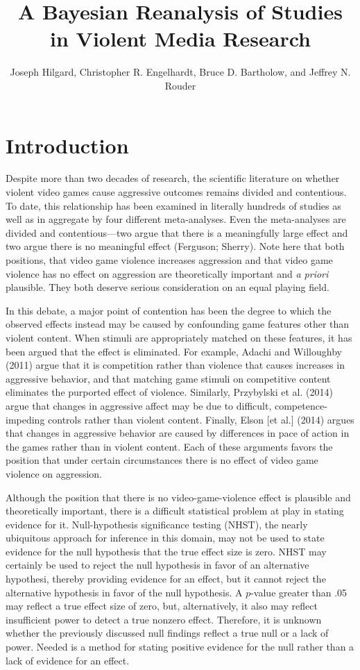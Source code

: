 \documentclass[fignum,nobf,man]{apa}
\author{Joseph Hilgard, Christopher R. Engelhardt, Bruce D. Bartholow, and Jeffrey N. Rouder}
\title{A Bayesian Reanalysis of Studies in Violent Media Research}
\affiliation{University of Missouri}
\begin{document}
\maketitle

\section*{Introduction}
Despite more than two decades of research, the scientific literature on whether violent video games cause aggressive outcomes remains divided and contentious. To date, this relationship has been examined in literally hundreds of studies as well as in aggregate by four different meta-analyses. Even the meta-analyses are divided and contentious---two argue that there is a meaningfully large effect \citep{Anderson:etal:2010,Greietemeyer:Mugge:2014} and two argue there is no meaningful effect (Ferguson; Sherry). Note here that both positions, that video game violence increases aggression and that video game violence has no effect on aggression are theoretically important and {\em a priori} plausible.  They both deserve serious consideration on an equal playing field.

In this debate, a major point of contention has been the degree to which the observed effects instead may be caused by confounding game features other than violent content. When stimuli are appropriately matched on these features, it has been argued that the effect is eliminated. For example, Adachi and Willoughby (2011) argue that it is competition rather than violence that causes increases in aggressive behavior, and that matching game stimuli on competitive content eliminates the purported effect of violence. Similarly, Przybylski et al. (2014) argue that changes in aggressive affect may be due to difficult, competence-impeding controls rather than violent content. Finally,  Elson [et al.] (2014) argues that changes in aggressive behavior are caused by differences in pace of action in the games rather than in violent content. Each of these arguments favors the position that under certain circumstances there is no effect of video game violence on aggression.

Although the position that there is no video-game-violence effect is plausible and theoretically important, there is a difficult statistical problem at play in stating evidence for it. Null-hypothesis significance testing (NHST), the nearly ubiquitous approach for inference in this domain, may not be used to state evidence for the null hypothesis that the true effect size is zero.  NHST may certainly be used to reject the null hypothesis in favor of an alternative hypothesi, thereby providing evidence for an effect, but it cannot reject the alternative hypothesis in favor of the null hypothesis. A $p$-value greater than .05 may reflect a true effect size of zero, but, alternatively, it also may reflect insufficient power to detect a true nonzero effect. Therefore, it is unknown whether the previously discussed null findings reflect a true null or a lack of power.    Needed is a method for stating positive evidence for the null rather than a lack of evidence for an effect.
\end{document}
